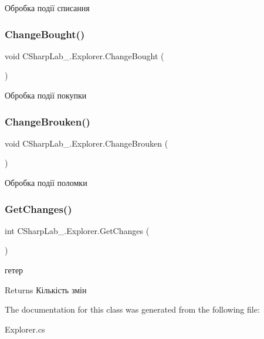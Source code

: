Обробка події списання 

\hypertarget{class_c_sharp_lab__1_1_1_explorer_a4b685e3fdc095b24a2854f23a44e439b}{}\label{class_c_sharp_lab__1_1_1_explorer_a4b685e3fdc095b24a2854f23a44e439b} 
\subsubsection{\texorpdfstring{Change\+Bought()}{ChangeBought()}}
{\footnotesize\ttfamily void C\+Sharp\+Lab\+\_.\+Explorer.\+Change\+Bought (\begin{DoxyParamCaption}{ }\end{DoxyParamCaption})}



Обробка події покупки 

\hypertarget{class_c_sharp_lab__1_1_1_explorer_a65669ed2aaf2eb10382e4644dec50391}{}\label{class_c_sharp_lab__1_1_1_explorer_a65669ed2aaf2eb10382e4644dec50391} 
\subsubsection{\texorpdfstring{Change\+Brouken()}{ChangeBrouken()}}
{\footnotesize\ttfamily void C\+Sharp\+Lab\+\_.\+Explorer.\+Change\+Brouken (\begin{DoxyParamCaption}{ }\end{DoxyParamCaption})}



Обробка події поломки 

\hypertarget{class_c_sharp_lab__1_1_1_explorer_a42cbc06f2e5c5614bea708dbc43250a6}{}\label{class_c_sharp_lab__1_1_1_explorer_a42cbc06f2e5c5614bea708dbc43250a6} 
\subsubsection{\texorpdfstring{Get\+Changes()}{GetChanges()}}
{\footnotesize\ttfamily int C\+Sharp\+Lab\+\_.\+Explorer.\+Get\+Changes (\begin{DoxyParamCaption}{ }\end{DoxyParamCaption})}



гетер 

\begin{DoxyReturn}{Returns}
Кількість змін
\end{DoxyReturn}


The documentation for this class was generated from the following file\+:\begin{DoxyCompactItemize}
\item 
Explorer.\+cs\end{DoxyCompactItemize}
